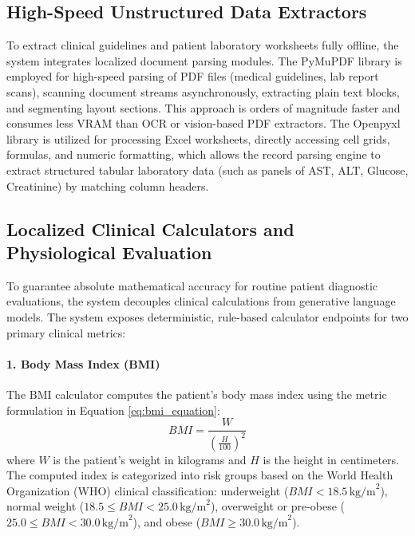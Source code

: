 \documentclass[../main.tex]{subfiles}
\begin{document}
\subsection{High-Speed Unstructured Data Extractors}
To extract clinical guidelines and patient laboratory worksheets fully offline, the system integrates localized document parsing modules. The PyMuPDF library is employed for high-speed parsing of PDF files (medical guidelines, lab report scans), scanning document streams asynchronously, extracting plain text blocks, and segmenting layout sections. This approach is orders of magnitude faster and consumes less VRAM than OCR or vision-based PDF extractors. The Openpyxl library is utilized for processing Excel worksheets, directly accessing cell grids, formulas, and numeric formatting, which allows the record parsing engine to extract structured tabular laboratory data (such as panels of AST, ALT, Glucose, Creatinine) by matching column headers.

\subsection{Localized Clinical Calculators and Physiological Evaluation}

To guarantee absolute mathematical accuracy for routine patient diagnostic evaluations, the system decouples clinical calculations from generative language models. The system exposes deterministic, rule-based calculator endpoints for two primary clinical metrics:

\paragraph{1. Body Mass Index (BMI)}
The BMI calculator computes the patient's body mass index using the metric formulation in Equation \eqref{eq:bmi_equation}:
\begin{equation}\label{eq:bmi_equation}
BMI = \frac{W}{\left(\frac{H}{100}\right)^2}
\end{equation}
where $W$ is the patient's weight in kilograms and $H$ is the height in centimeters. The computed index is categorized into risk groups based on the World Health Organization (WHO) clinical classification: underweight ($BMI < 18.5\,\text{kg/m}^2$), normal weight ($18.5 \le BMI < 25.0\,\text{kg/m}^2$), overweight or pre-obese ($25.0 \le BMI < 30.0\,\text{kg/m}^2$), and obese ($BMI \ge 30.0\,\text{kg/m}^2$).
\end{document}

